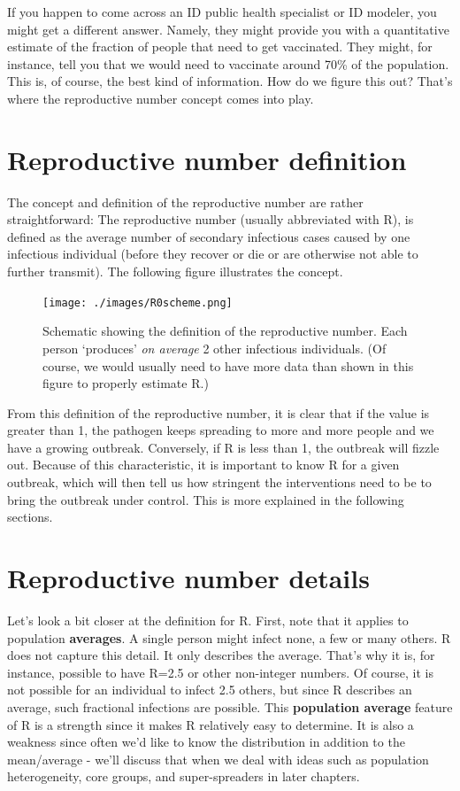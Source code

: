 \documentclass[
]{book}
\begin{document}
If you happen to come across an ID public health specialist or ID modeler, you might get a different answer. Namely, they might provide you with a quantitative estimate of the fraction of people that need to get vaccinated. They might, for instance, tell you that we would need to vaccinate around 70\% of the population. This is, of course, the best kind of information. How do we figure this out? That's where the reproductive number concept comes into play.

\hypertarget{reproductive-number-definition}{%
\section{Reproductive number definition}\label{reproductive-number-definition}}

The concept and definition of the reproductive number are rather straightforward: The reproductive number (usually abbreviated with R), is defined as the average number of secondary infectious cases caused by one infectious individual (before they recover or die or are otherwise not able to further transmit). The following figure illustrates the concept.

\begin{figure}
\centering
\texttt{[image: ./images/R0scheme.png]}
\caption{Schematic showing the definition of the reproductive number. Each person `produces' \emph{on average} 2 other infectious individuals. (Of course, we would usually need to have more data than shown in this figure to properly estimate R.)}
\end{figure}

From this definition of the reproductive number, it is clear that if the value is greater than 1, the pathogen keeps spreading to more and more people and we have a growing outbreak. Conversely, if R is less than 1, the outbreak will fizzle out. Because of this characteristic, it is important to know R for a given outbreak, which will then tell us how stringent the interventions need to be to bring the outbreak under control. This is more explained in the following sections.

\hypertarget{reproductive-number-details}{%
\section{Reproductive number details}\label{reproductive-number-details}}

Let's look a bit closer at the definition for R. First, note that it applies to population \textbf{averages}. A single person might infect none, a few or many others. R does not capture this detail. It only describes the average. That's why it is, for instance, possible to have R=2.5 or other non-integer numbers. Of course, it is not possible for an individual to infect 2.5 others, but since R describes an average, such fractional infections are possible. This \textbf{population average} feature of R is a strength since it makes R relatively easy to determine. It is also a weakness since often we'd like to know the distribution in addition to the mean/average - we'll discuss that when we deal with ideas such as population heterogeneity, core groups, and super-spreaders in later chapters.
\end{document}
